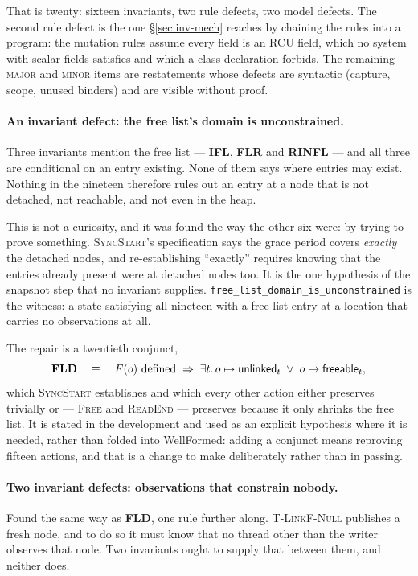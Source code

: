 That is twenty: sixteen invariants, two rule defects, two model defects.  The
second rule defect is the one \S\ref{sec:inv-mech} reaches by chaining the rules
into a program: the mutation rules assume every field is an RCU field, which no
system with scalar fields satisfies and which a class declaration forbids.  The remaining
\textsc{major} and \textsc{minor} items are restatements whose defects are
syntactic (capture, scope, unused binders) and are visible without proof.

\paragraph{An invariant defect: the free list's domain is unconstrained.}
\label{sec:defect-fld}
Three invariants mention the free list --- \textbf{IFL}, \textbf{FLR} and
\textbf{RINFL} --- and all three are conditional on an entry existing.  None of
them says where entries may exist.  Nothing in the nineteen therefore rules out
an entry at a node that is not detached, not reachable, and not even in the
heap.

This is not a curiosity, and it was found the way the other six were: by trying
to prove something.  \textsc{SyncStart}'s specification says the grace period
covers \emph{exactly} the detached nodes, and re-establishing ``exactly''
requires knowing that the entries already present were at detached nodes too.
It is the one hypothesis of the snapshot step that no invariant supplies.
\texttt{free\_list\_domain\_is\_unconstrained} is the witness: a state
satisfying all nineteen with a free-list entry at a location that carries no
observations at all.

The repair is a twentieth conjunct,
\[
  \textbf{FLD} \quad\equiv\quad
  F(o) \text{ defined} \;\Rightarrow\; \exists t \ldotp
  o \mapsto \textsf{unlinked}{}_t \;\vee\; o \mapsto \textsf{freeable}{}_t,
\]
which \textsc{SyncStart} establishes and which every other action either
preserves trivially or --- \textsc{Free} and \textsc{ReadEnd} --- preserves
because it only shrinks the free list.  It is stated in the development and used
as an explicit hypothesis where it is needed, rather than folded into \textsf{WellFormed}:
adding a conjunct means reproving fifteen actions, and that is a change to make
deliberately rather than in passing.

\paragraph{Two invariant defects: observations that constrain nobody.}
\label{sec:defect-obs}
Found the same way as \textbf{FLD}, one rule further along.
\textsc{T-LinkF-Null} publishes a fresh node, and to do so it must know that no
thread other than the writer observes that node.  Two invariants ought to supply
that between them, and neither does.

